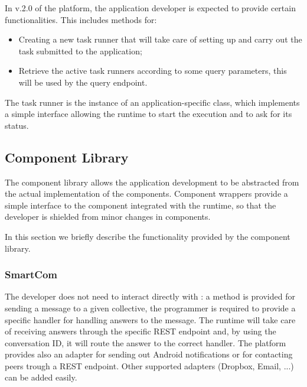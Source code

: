 In v.2.0 of the platform, the application developer is expected to provide certain functionalities. This includes methods for:
\begin{itemize}
 	\item Creating a new task runner that will take care of setting up and carry out the task submitted to the application;
 	\item Retrieve the active task runners according to some query parameters, this will be used by the query endpoint.
\end{itemize}
The task runner is the instance of an application-specific class, which implements a simple interface allowing the runtime to start the execution and to ask for its status.


\subsection{Component Library}
The component library allows the application development to be abstracted from the actual implementation of the components.
Component wrappers provide a simple interface to the component integrated with the runtime, so that the developer is shielded from minor changes in components. %

In this section we briefly describe the functionality %
provided by the component library. %
\subsubsection{SmartCom}
The developer does not need to interact directly with \mdl: 
a method is provided for sending a message to a given collective, the programmer is required to provide a specific handler for handling answers to the message. The runtime will take care of receiving answers through the specific REST endpoint 
and, by using the conversation ID, it will route the answer to the correct handler. The platform provides also an adapter for sending out Android notifications or for contacting peers trough a REST endpoint. Other supported adapters (Dropbox, Email, ...) can be added easily. 

